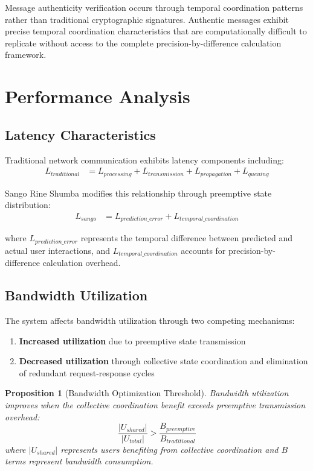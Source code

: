 \documentclass[12pt,a4paper]{article}
\newtheorem{proposition}{Proposition}
\begin{document}
Message authenticity verification occurs through temporal coordination patterns rather than traditional cryptographic signatures. Authentic messages exhibit precise temporal coordination characteristics that are computationally difficult to replicate without access to the complete precision-by-difference calculation framework.

\section{Performance Analysis}

\subsection{Latency Characteristics}

Traditional network communication exhibits latency components including:
\begin{align}
L_{traditional} &= L_{processing} + L_{transmission} + L_{propagation} + L_{queuing}
\end{align}

Sango Rine Shumba modifies this relationship through preemptive state distribution:
\begin{align}
L_{sango} &= L_{prediction\_error} + L_{temporal\_coordination}
\end{align}

where $L_{prediction\_error}$ represents the temporal difference between predicted and actual user interactions, and $L_{temporal\_coordination}$ accounts for precision-by-difference calculation overhead.

\subsection{Bandwidth Utilization}

The system affects bandwidth utilization through two competing mechanisms:
\begin{enumerate}
\item \textbf{Increased utilization} due to preemptive state transmission
\item \textbf{Decreased utilization} through collective state coordination and elimination of redundant request-response cycles
\end{enumerate}

\begin{proposition}[Bandwidth Optimization Threshold]
Bandwidth utilization improves when the collective coordination benefit exceeds preemptive transmission overhead:
\begin{equation}
\frac{|U_{shared}|}{|U_{total}|} > \frac{B_{preemptive}}{B_{traditional}}
\end{equation}
where $|U_{shared}|$ represents users benefiting from collective coordination and $B$ terms represent bandwidth consumption.
\end{proposition}
\end{document}
